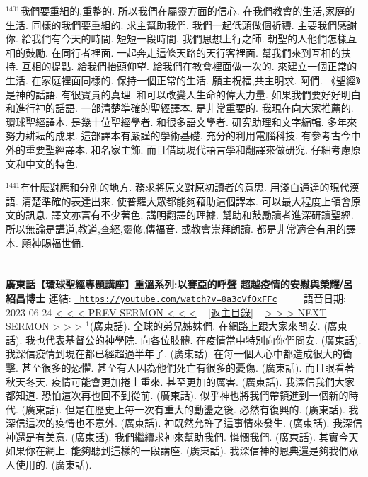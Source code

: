 \documentclass{book}
\begin{document}
$^{1401}$我們要重組的,重整的.
所以我們在屬靈方面的信心.
在我們教會的生活,家庭的生活.
同樣的我們要重組的.
求主幫助我們.
我們一起低頭做個祈禱.
主要我們感謝你.
給我們有今天的時間.
短短一段時間.
我們思想上行之師.
朝聖的人他們怎樣互相的鼓勵.
在同行者裡面.
一起奔走這條天路的天行客裡面.
幫我們來到互相的扶持.
互相的提點.
給我們抬頭仰望.
給我們在教會裡面做一次的.
來建立一個正常的生活.
在家庭裡面同樣的.
保持一個正常的生活.
願主祝福,共主明求.
阿們.
《聖經》是神的話語.
有很寶貴的真理.
和可以改變人生命的偉大力量.
如果我們要好好明白和進行神的話語.
一部清楚準確的聖經譯本.
是非常重要的.
我現在向大家推薦的.
環球聖經譯本.
是幾十位聖經學者.
和很多語文學者.
研究助理和文字編輯.
多年來努力耕耘的成果.
這部譯本有嚴謹的學術基礎.
充分的利用電腦科技.
有參考古今中外的重要聖經譯本.
和名家主飾.
而且借助現代語言學和翻譯來做研究.
仔細考慮原文和中文的特色.

$^{1441}$有什麼對應和分別的地方.
務求將原文對原初讀者的意思.
用淺白通達的現代漢語.
清楚準確的表達出來.
使普羅大眾都能夠藉助這個譯本.
可以最大程度上領會原文的訊息.
譯文亦富有不少著色.
講明翻譯的理據.
幫助和鼓勵讀者進深研讀聖經.
所以無論是講道,教道,查經,靈修,傳福音.
或教會崇拜朗讀.
都是非常適合有用的譯本.
願神賜福世俑.
\newpage



\section{}
\label{sec:8a3cVfOxFFc}
\textbf{廣東話【環球聖經專題講座】重溫系列:以賽亞的呼聲 超越疫情的安慰與榮耀⧸呂紹昌博士}
\newline
\newline
連結: \href{https://youtube.com/watch?v=8a3cVfOxFFc}{\texttt{ https://youtube.com/watch?v=8a3cVfOxFFc}} ~~~~ 語音日期: 2023-06-24 
\newline
\newline
\hyperref[sec:YWND_9pGVGE]{\small{< < < PREV SERMON < < <}}
~
\hyperref[sec:index]{\small{[返主目錄]}}
~
\hyperref[sec:o_naHdmPOsI]{\small{> > > NEXT SERMON > > >}}
\newline
\newline
$^{1}$(廣東話).
全球的弟兄姊妹們.
在網路上跟大家來問安.
(廣東話).
我也代表基督公的神學院.
向各位肢體.
在疫情當中特別向你們問安.
(廣東話).
我深信疫情到現在都已經超過半年了.
(廣東話).
在每一個人心中都造成很大的衝擊.
甚至很多的恐懼.
甚至有人因為他們死亡有很多的憂傷.
(廣東話).
而且眼看著秋天冬天.
疫情可能會更加捲土重來.
甚至更加的厲害.
(廣東話).
我深信我們大家都知道.
恐怕這次再也回不到從前.
(廣東話).
似乎神也將我們帶領進到一個新的時代.
(廣東話).
但是在歷史上每一次有重大的動盪之後.
必然有復興的.
(廣東話).
我深信這次的疫情也不意外.
(廣東話).
神既然允許了這事情來發生.
(廣東話).
我深信神還是有美意.
(廣東話).
我們繼續求神來幫助我們.
憐憫我們.
(廣東話).
其實今天如果你在網上.
能夠聽到這樣的一段講座.
(廣東話).
我深信神的恩典還是夠我們眾人使用的.
(廣東話).
\end{document}
